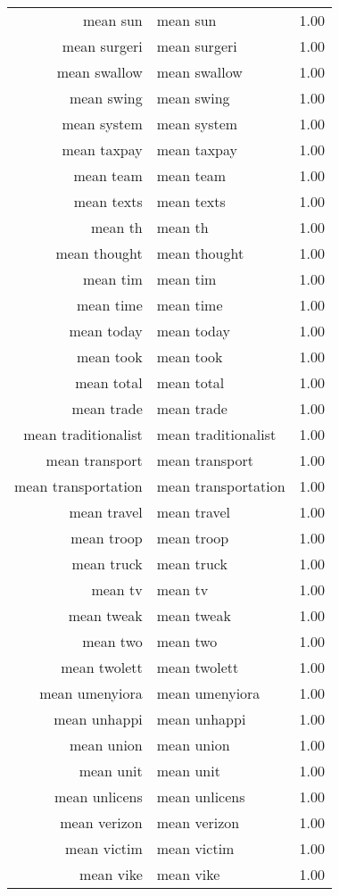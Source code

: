 \begin{table}[ht]
\begin{tabular}{rlr}
  mean sun & mean sun & 1.00 \\ 
  mean surgeri & mean surgeri & 1.00 \\ 
  mean swallow & mean swallow & 1.00 \\ 
  mean swing & mean swing & 1.00 \\ 
  mean system & mean system & 1.00 \\ 
  mean taxpay & mean taxpay & 1.00 \\ 
  mean team & mean team & 1.00 \\ 
  mean texts & mean texts & 1.00 \\ 
  mean th & mean th & 1.00 \\ 
  mean thought & mean thought & 1.00 \\ 
  mean tim & mean tim & 1.00 \\ 
  mean time & mean time & 1.00 \\ 
  mean today & mean today & 1.00 \\ 
  mean took & mean took & 1.00 \\ 
  mean total & mean total & 1.00 \\ 
  mean trade & mean trade & 1.00 \\ 
  mean traditionalist & mean traditionalist & 1.00 \\ 
  mean transport & mean transport & 1.00 \\ 
  mean transportation & mean transportation & 1.00 \\ 
  mean travel & mean travel & 1.00 \\ 
  mean troop & mean troop & 1.00 \\ 
  mean truck & mean truck & 1.00 \\ 
  mean tv & mean tv & 1.00 \\ 
  mean tweak & mean tweak & 1.00 \\ 
  mean two & mean two & 1.00 \\ 
  mean twolett & mean twolett & 1.00 \\ 
  mean umenyiora & mean umenyiora & 1.00 \\ 
  mean unhappi & mean unhappi & 1.00 \\ 
  mean union & mean union & 1.00 \\ 
  mean unit & mean unit & 1.00 \\ 
  mean unlicens & mean unlicens & 1.00 \\ 
  mean verizon & mean verizon & 1.00 \\ 
  mean victim & mean victim & 1.00 \\ 
  mean vike & mean vike & 1.00 \\ 

\end{tabular}
\end{table}
